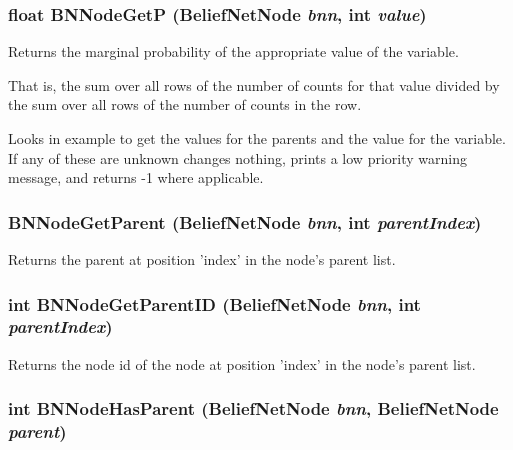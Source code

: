 \subsubsection{\setlength{\rightskip}{0pt plus 5cm}float BNNode\-Get\-P ({\bf Belief\-Net\-Node} {\em bnn}, int {\em value})}\label{BeliefNet_8h_a35}


Returns the marginal probability of the appropriate value of the variable. 

That is, the sum over all rows of the number of counts for that value divided by the sum over all rows of the number of counts in the row.

Looks in example to get the values for the parents and the value for the variable. If any of these are unknown changes nothing, prints a low priority warning message, and returns -1 where applicable. 
\subsubsection{ BNNode\-Get\-Parent ({\bf Belief\-Net\-Node} {\em bnn}, int {\em parent\-Index})}\label{BeliefNet_8h_a13}


Returns the parent at position 'index' in the node's parent list. 

\subsubsection{\setlength{\rightskip}{0pt plus 5cm}int BNNode\-Get\-Parent\-ID ({\bf Belief\-Net\-Node} {\em bnn}, int {\em parent\-Index})}\label{BeliefNet_8h_a14}


Returns the node id of the node at position 'index' in the node's parent list. 

\subsubsection{\setlength{\rightskip}{0pt plus 5cm}int BNNode\-Has\-Parent ({\bf Belief\-Net\-Node} {\em bnn}, {\bf Belief\-Net\-Node} {\em parent})}\label{BeliefNet_8h_a17}


